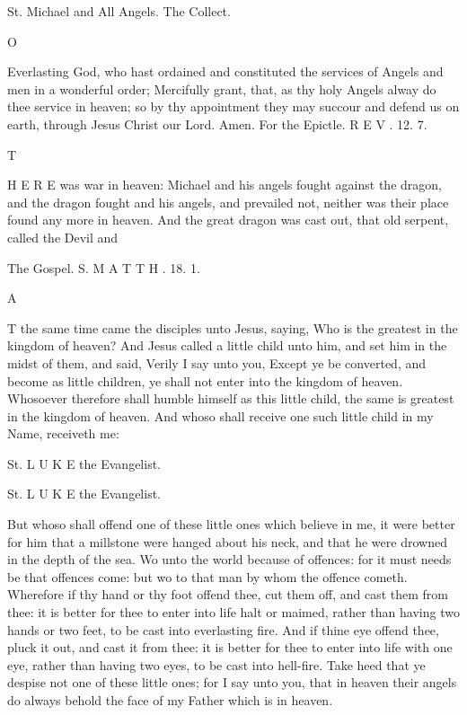 St. Michael and All Angels. The Collect.

O

Everlasting God, who hast ordained and constituted the services of Angels and men in a wonderful order; Mercifully grant, that, as thy holy Angels alway do thee service in heaven; so by thy appointment they may succour and defend us on earth, through Jesus Christ our Lord. Amen. For the Epictle. R E V . 12. 7.

T

H E R E was war in heaven: Michael and his angels fought against the dragon, and the dragon fought and his angels, and prevailed not, neither was their place found any more in heaven. And the great dragon was cast out, that old serpent, called the Devil and

The Gospel. S. M A T T H . 18. 1.

A

T the same time came the disciples unto Jesus, saying, Who is the greatest in the kingdom of heaven? And Jesus called a little child unto him, and set him in the midst of them, and said, Verily I say unto you, Except ye be converted, and become as little children, ye shall not enter into the kingdom of heaven. Whosoever therefore shall humble himself as this little child, the same is greatest in the kingdom of heaven. And whoso shall receive one such little child in my Name, receiveth me:

St. L U K E the Evangelist.

St. L U K E the Evangelist.

But whoso shall offend one of these little ones which believe in me, it were better for him that a millstone were hanged about his neck, and that he were drowned in the depth of the sea. Wo unto the world because of offences: for it must needs be that offences come: but wo to that man by whom the offence cometh. Wherefore if thy hand or thy foot offend thee, cut them off, and cast them from thee: it is better for thee to enter into life halt or maimed, rather than having two hands or two feet, to be cast into everlasting fire. And if thine eye offend thee, pluck it out, and cast it from thee: it is better for thee to enter into life with one eye, rather than having two eyes, to be cast into hell-fire. Take heed that ye despise not one of these little ones; for I say unto you, that in heaven their angels do always behold the face of my Father which is in heaven.

